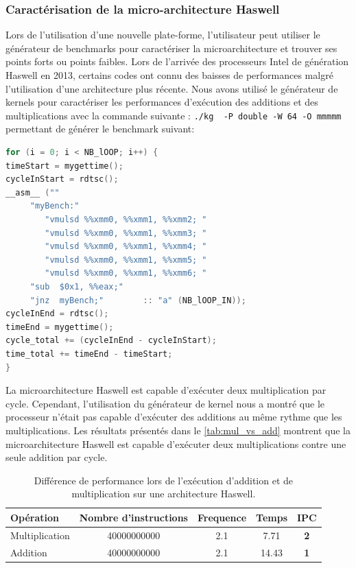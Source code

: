     
    \subsubsection{Caractérisation de la micro-architecture Haswell}
    Lors de l'utilisation d'une nouvelle plate-forme, l'utilisateur peut utiliser le générateur de benchmarks pour caractériser la microarchitecture et trouver ses points forts ou points faibles. Lors de l'arrivée des processeurs Intel de génération Haswell en 2013, certains codes ont connu des baisses de performances malgré l'utilisation d'une architecture plus récente. Nous avons utilisé le générateur de kernels pour caractériser les performances d'exécution des additions et des multiplications avec la commande suivante : \verb|./kg  -P double -W 64 -O mmmmm| permettant de générer le benchmark suivant:
    
    \begin{lstlisting}[label=lst:kg_mul ,language=C]
for (i = 0; i < NB_lOOP; i++) {
timeStart = mygettime();
cycleInStart = rdtsc();
__asm__ ("" 
     "myBench:"  
   		"vmulsd %%xmm0, %%xmm1, %%xmm2; "
   		"vmulsd %%xmm0, %%xmm1, %%xmm3; "
   		"vmulsd %%xmm0, %%xmm1, %%xmm4; "
   		"vmulsd %%xmm0, %%xmm1, %%xmm5; "
   		"vmulsd %%xmm0, %%xmm1, %%xmm6; "
     "sub  $0x1, %%eax;"
     "jnz  myBench;"		:: "a" (NB_lOOP_IN));
cycleInEnd = rdtsc();
timeEnd = mygettime();
cycle_total += (cycleInEnd - cycleInStart);
time_total += timeEnd - timeStart;
}
\end{lstlisting}
    
     La microarchitecture Haswell est capable d'exécuter deux multiplication par cycle. Cependant, l'utilisation du générateur de kernel nous a montré que le processeur n'était pas capable d'exécuter des additions au même rythme que les multiplications. Les résultats présentés dans le \autoref{tab:mul_vs_add} montrent que la microarchitecture Haswell est capable d'exécuter deux multiplications contre une seule addition par cycle.

    \begin{table}[h!]
    \centering
    \begin{tabular}{|l|c|c|c|c|}
        \hline
        Opération & Nombre d'instructions & Frequence & Temps & IPC \\ \hline
        Multiplication & 40000000000 & 2.1 & 7.71 & \textbf{2} \\ \hline
        Addition & 40000000000 & 2.1 & 14.43 & {\color[HTML]{963400} \textbf{1}} \\ \hline
        \end{tabular}%
        
        \caption{Différence de performance lors de l'exécution d'addition et de multiplication sur une architecture Haswell.}
        \label{tab:mul_vs_add}
    \end{table}
    
